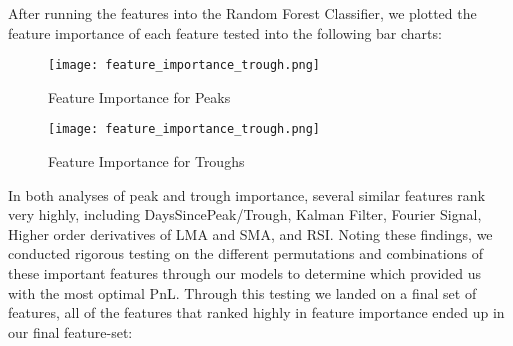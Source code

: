 \documentclass{article}
\begin{document}
\noindent After running the features into the Random Forest Classifier, we plotted the feature importance of each feature tested into the following bar charts:
\newline
\newline

\begin{figure}[H]
  \centering
  \texttt{[image: feature\_importance\_trough.png]}
  \caption{Feature Importance for Peaks}
\end{figure}

\begin{figure}[H]
  \centering
  \texttt{[image: feature\_importance\_trough.png]}
  \caption{Feature Importance for Troughs}
\end{figure}

\noindent In both analyses of peak and trough importance, several similar features rank very highly, including DaysSincePeak/Trough, Kalman Filter, Fourier Signal, Higher order derivatives of LMA and SMA, and RSI. Noting these findings, we conducted rigorous testing on the different permutations and combinations of these important features through our models to determine which provided us with the most optimal PnL. Through this testing we landed on a final set of features, all of the features that ranked highly in feature importance ended up in our final feature-set:
\end{document}
